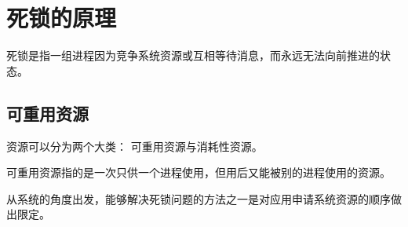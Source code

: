 
\section{死锁的原理}
{
    死锁是指一组进程因为竞争系统资源或互相等待消息，而永远无法向前推进的状态。

    \subsection{可重用资源}
    {
        资源可以分为两个大类：
        可重用资源与消耗性资源。

        可重用资源指的是一次只供一个进程使用，但用后又能被别的进程使用的资源。

        从系统的角度出发，能够解决死锁问题的方法之一是对应用申请系统资源的顺序做出限定。
    }
}
